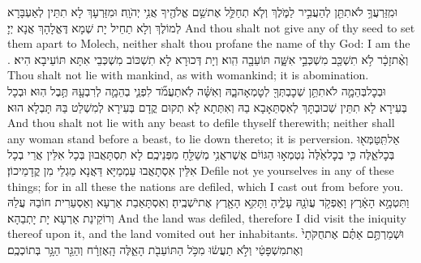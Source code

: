 {וּמִֽזַּרְעֲךָ֥ לֹא\maqqaf תִתֵּ֖ן לְהַעֲבִ֣יר לַמֹּ֑לֶךְ וְלֹ֧א תְחַלֵּ֛ל אֶת\maqqaf שֵׁ֥ם אֱלֹהֶ֖יךָ אֲנִ֥י יְהֹוָֽה׃}
{וּמִזַּרְעָךְ לָא תִתֵּין לְאַעְבָּרָא לְמוֹלֶךְ וְלָא תַחֵיל יָת שְׁמָא דֶּאֱלָהָךְ אֲנָא יְיָ׃}
{And thou shalt not give any of thy seed to set them apart to Molech, neither shalt thou profane the name of thy God: I am the \lord.}{}
{וְאֶ֨ת\maqqaf זָכָ֔ר לֹ֥א תִשְׁכַּ֖ב מִשְׁכְּבֵ֣י אִשָּׁ֑ה תּוֹעֵבָ֖ה הִֽוא׃}
{וְיָת דְּכוּרָא לָא תִשְׁכּוֹב מִשְׁכְּבֵי אִתָּא תּוֹעֵיבָא הִיא׃}
{Thou shalt not lie with mankind, as with womankind; it is abomination.}{}
{וּבְכׇל\maqqaf בְּהֵמָ֛ה לֹא\maqqaf תִתֵּ֥ן שְׁכׇבְתְּךָ֖ לְטׇמְאָה\maqqaf בָ֑הּ וְאִשָּׁ֗ה לֹֽא\maqqaf תַעֲמֹ֞ד לִפְנֵ֧י בְהֵמָ֛ה לְרִבְעָ֖הּ תֶּ֥בֶל הֽוּא׃}
{וּבְכָל בְּעִירָא לָא תִתֵּין שְׁכוּבְתָּךְ לְאִסְתַּאָבָא בַהּ וְאִתְּתָא לָא תְקוּם קֳדָם בְּעִירָא לְמִשְׁלַט בַּהּ תָּבְלָא הוּא׃}
{And thou shalt not lie with any beast to defile thyself therewith; neither shall any woman stand before a beast, to lie down thereto; it is perversion.}{}
{אַל\maqqaf תִּֽטַּמְּא֖וּ בְּכׇל\maqqaf אֵ֑לֶּה כִּ֤י בְכׇל\maqqaf אֵ֙לֶּה֙ נִטְמְא֣וּ הַגּוֹיִ֔ם אֲשֶׁר\maqqaf אֲנִ֥י מְשַׁלֵּ֖חַ מִפְּנֵיכֶֽם׃}
{לָא תִסְתָּאֲבוּן בְּכָל אִלֵּין אֲרֵי בְכָל אִלֵּין אִסְתָאֲבוּ עַמְמַיָּא דַּאֲנָא מַגְלֵי מִן קֳדָמֵיכוֹן׃}
{Defile not ye yourselves in any of these things; for in all these the nations are defiled, which I cast out from before you.}{}
{וַתִּטְמָ֣א הָאָ֔רֶץ וָאֶפְקֹ֥ד עֲוֺנָ֖הּ עָלֶ֑יהָ וַתָּקִ֥א הָאָ֖רֶץ אֶת\maqqaf יֹשְׁבֶֽיהָ׃}
{וְאִסְתָּאַבַת אַרְעָא וְאַסְעַרִית חוֹבַהּ עֲלַהּ וְרוֹקֵינַת אַרְעָא יָת יָתְבַהָא׃}
{And the land was defiled, therefore I did visit the iniquity thereof upon it, and the land vomited out her inhabitants.}{}
{וּשְׁמַרְתֶּ֣ם אַתֶּ֗ם אֶת\maqqaf חֻקֹּתַי֙ וְאֶת\maqqaf מִשְׁפָּטַ֔י וְלֹ֣א תַעֲשׂ֔וּ מִכֹּ֥ל הַתּוֹעֵבֹ֖ת הָאֵ֑לֶּה הָֽאֶזְרָ֔ח וְהַגֵּ֖ר הַגָּ֥ר בְּתוֹכְכֶֽם׃}
